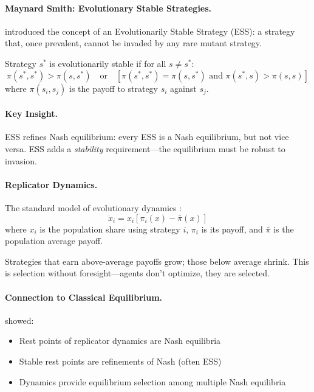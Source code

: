 \paragraph{Maynard Smith: Evolutionary Stable Strategies.}
\citet{maynardsmith1982} introduced the concept of an Evolutionarily Stable Strategy (ESS):
a strategy that, once prevalent, cannot be invaded by any rare mutant strategy.

\begin{definition}[ESS]
Strategy $s^*$ is evolutionarily stable if for all $s \neq s^*$:
\begin{equation}
  \pi(s^*, s^*) > \pi(s, s^*) \quad \text{or} \quad
  [\pi(s^*, s^*) = \pi(s, s^*) \text{ and } \pi(s^*, s) > \pi(s, s)]
\end{equation}
where $\pi(s_i, s_j)$ is the payoff to strategy $s_i$ against $s_j$.
\end{definition}

\paragraph{Key Insight.}
ESS refines Nash equilibrium: every ESS is a Nash equilibrium, but not vice versa.
ESS adds a \emph{stability} requirement---the equilibrium must be robust to invasion.

\paragraph{Replicator Dynamics.}
The standard model of evolutionary dynamics \citep{taylor1978}:
\begin{equation}
  \dot{x}_i = x_i \left[ \pi_i(x) - \bar{\pi}(x) \right]
  \label{eq:replicator}
\end{equation}
where $x_i$ is the population share using strategy $i$, $\pi_i$ is its payoff,
and $\bar{\pi}$ is the population average payoff.

Strategies that earn above-average payoffs grow; those below average shrink.
This is selection without foresight---agents don't optimize, they are selected.

\paragraph{Connection to Classical Equilibrium.}
\citet{weibull1995} showed:
\begin{itemize}
  \item Rest points of replicator dynamics are Nash equilibria
  \item Stable rest points are refinements of Nash (often ESS)
  \item Dynamics provide equilibrium selection among multiple Nash equilibria
\end{itemize}

